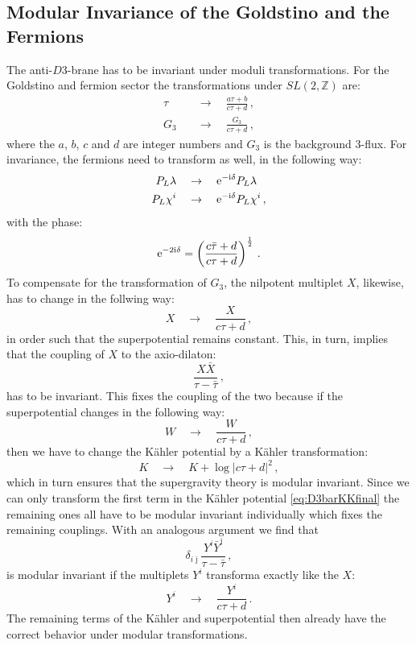 \documentclass[a4paper,12pt,twoside,openright]{report}
\newcommand{\be}{\begin{equation}}
\newcommand{\ee}{\end{equation}}
\newcommand{\bea}{\begin{equation}\begin{aligned}}
\newcommand{\eea}{\end{aligned}\end{equation}}
\def\rmi{{\rm i}}
\def\rme{{\rm e}}
\def\jb{{\bar \jmath}}
\begin{document}
\subsection{Modular Invariance of the Goldstino and the Fermions}
The anti-$D3$-brane has to be invariant under moduli transformations. For the Goldstino and fermion sector the transformations under $SL(2,\mathbb{Z})$ are:
\bea 
\tau \quad &\to \quad \frac{a\tau + b}{c \tau + d}\,,\\
G_3 \quad &\to \quad \frac{G_3}{c\tau + d}\,,
\eea 
where the $a$, $b$, $c$ and $d$ are integer numbers and $G_3$ is the background 3-flux. For invariance, the fermions need to transform as well, in the following way:
\bea 
P_L \lambda \quad &\to \quad \rme^{-\rmi \delta} P_L \lambda \\
P_L \chi^i \quad &\to \quad \rme^{-\rmi \delta} P_L \chi^i\,,
\eea 
with the phase:
\be 
\rme^{-2\rmi\delta} = \left( \frac{c\bar{\tau}+d}{c \tau + d} \right)^{\frac{1}{2}}\,.
\ee
To compensate for the transformation of $G_3$, the nilpotent multiplet $X$, likewise, has to change in the follwing way:
\be 
X \quad \to \quad \frac{X}{c\tau + d}\,,
\ee
in order such that the superpotential remains constant. This, in turn, implies that the coupling of $X$ to the axio-dilaton:
\be 
\frac{X \bar{X}}{\tau-\bar{\tau}}\,,
\ee
has to be invariant. This fixes the coupling of the two because if the superpotential changes in the following way:
\be 
W \quad \to \quad \frac{W}{c\tau + d}\,,
\ee
then we have to change the Kähler potential by a Kähler transformation:
\be 
K \quad \to \quad K + \log | c \tau + d |^2\,,
\ee
which in turn ensures that the supergravity theory is modular invariant. Since we can only transform the first term in the Kähler potential \eqref{eq:D3barKKfinal} the remaining ones all have to be modular invariant individually which fixes the remaining couplings. With an analogous argument we find that 
\be 
\delta_{i\jb} \frac{Y^i \bar{Y}^\jb}{\tau-\bar{\tau}}\,,
\ee
is modular invariant if the multiplets $Y^i$ transforma exactly like the $X$:
\be 
Y^i \quad \to \quad \frac{Y^i}{c\tau +d}\,.
\ee
The remaining terms of the Kähler and superpotential then already have the correct behavior under modular transformations.
\end{document}
